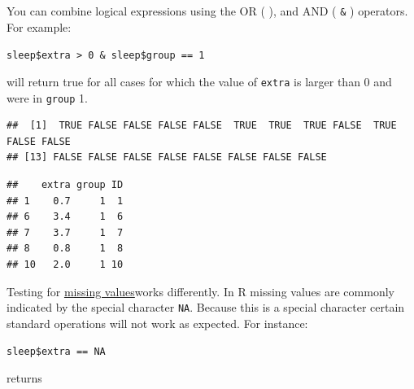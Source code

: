 \documentclass[
]{book}
\newenvironment{Shaded}{\begin{snugshade}}{\end{snugshade}}
\newcommand{\ConstantTok}[1]{\textcolor[rgb]{0.56,0.35,0.01}{#1}}
\newcommand{\DecValTok}[1]{\textcolor[rgb]{0.00,0.00,0.81}{#1}}
\newcommand{\NormalTok}[1]{#1}
\newcommand{\SpecialCharTok}[1]{\textcolor[rgb]{0.81,0.36,0.00}{\textbf{#1}}}
\begin{document}
You can combine logical expressions using the OR ( \texttt{\textbar{}} ), and AND ( \texttt{\&} ) operators. For example:

\texttt{sleep\$extra\ \textgreater{}\ 0\ \&\ sleep\$group\ ==\ 1}

will return true for all cases for which the value of \texttt{extra} is larger than 0 and were in \texttt{group} 1.

\begin{Shaded}
\end{Shaded}

\begin{verbatim}
##  [1]  TRUE FALSE FALSE FALSE FALSE  TRUE  TRUE  TRUE FALSE  TRUE FALSE FALSE
## [13] FALSE FALSE FALSE FALSE FALSE FALSE FALSE FALSE
\end{verbatim}

\begin{Shaded}
\end{Shaded}

\begin{verbatim}
##    extra group ID
## 1    0.7     1  1
## 6    3.4     1  6
## 7    3.7     1  7
## 8    0.8     1  8
## 10   2.0     1 10
\end{verbatim}

Testing for \ul{missing values}works differently. In R missing values are commonly indicated by the special character \texttt{NA}. Because this is a special character certain standard operations will not work as expected. For instance:

\texttt{sleep\$extra\ ==\ NA}

returns

\begin{Shaded}
\end{Shaded}
\end{document}
